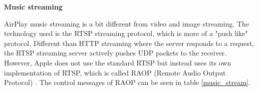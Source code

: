 \begin{table}[htb] 
\caption{AirPlay Photo Control HTTP requests \label{photo_stream}} 
\begin{center} 
\end{center} 
\end{table} 

\textbf{Music streaming}

AirPlay music streaming is a bit different from video and image streaming. The 
technology used is the RTSP streaming protocol, which is more of a "push like"
protocol. Different than HTTP streaming where the server responds to a request,
the RTSP streaming server actively pushes UDP packets to the receiver. However,
Apple does not use the standard RTSP but instead uses its own implementation of
RTSP, which is called RAOP (Remote Audio Output Protocol) \cite{AirPlay-spec}.
The control messages of RAOP can be seen in table \ref{music_stream}.

\begin{table}[htb] 
\caption{AirPlay Audio Control RTSP requests \label{music_stream}} 
\begin{center} 
\end{center} 
\end{table} 

